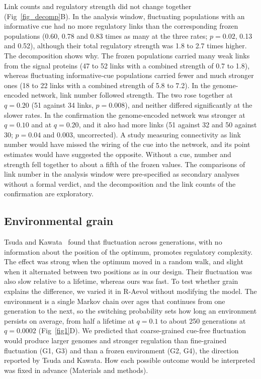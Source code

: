 \documentclass[10pt,letterpaper]{article}
\begin{document}
Link counts and regulatory strength did not change together
(Fig~\ref{fig_decomp}B). In the analysis window, fluctuating populations with an
informative cue had no more regulatory links than the corresponding frozen
populations (0.60, 0.78 and 0.83 times as many at the three rates; $p=0.02$,
0.13 and 0.52), although their total regulatory strength was 1.8 to 2.7 times
higher. The decomposition shows why. The frozen populations carried many weak links
from the signal proteins (47 to 52 links with a combined strength of 0.7 to 1.8),
whereas fluctuating informative-cue populations carried fewer and much stronger
ones (18 to 22 links with a combined strength of 5.8 to 7.2). In the
genome-encoded network, link number followed strength. The two rose together at
$q=0.20$ (51 against 34 links, $p=0.008$), and neither differed significantly at
the slower rates. In the confirmation the genome-encoded network was stronger at
$q=0.10$ and at $q=0.20$, and it also had more links (51 against 32 and 50 against
30; $p=0.04$ and $0.003$, uncorrected). A study measuring connectivity as link number would have missed the wiring
of the cue into the network, and its point estimates would have suggested the
opposite. Without a cue, number and strength fell together to about a fifth of
the frozen values. The comparisons of link number in the analysis window were
pre-specified as secondary analyses without a formal verdict, and the
decomposition and the link counts of the confirmation are exploratory.

\subsection*{Environmental grain}

Tsuda and Kawata~\cite{tsuda2010} found that fluctuation across generations,
with no information about the position of the optimum, promotes regulatory
complexity. The effect was strong when the optimum moved in a random walk, and
slight when it alternated between two positions as in our design. Their
fluctuation was also slow relative to a lifetime, whereas ours was fast. To test
whether grain explains the difference, we varied it in R-Aevol without
modifying the model. The environment is a single
Markov chain over ages that continues from one generation to the next, so the
switching probability sets how long an environment persists on average, from
half a lifetime at $q=0.1$ to about 250 generations at $q=0.0002$
(Fig~\ref{fig1}D). We predicted that coarse-grained cue-free fluctuation would
produce larger genomes and stronger regulation than fine-grained fluctuation
(G1, G3) and than a frozen environment (G2, G4), the direction reported by Tsuda
and Kawata. How each possible outcome would be interpreted was fixed in advance
(Materials and methods).
\end{document}
